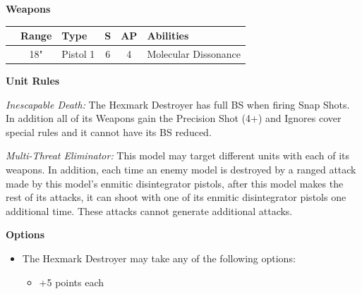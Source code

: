 \begin{minipage}[t]{0.72\textwidth}
	\vspace*{2em}
	\textbf{Weapons}
	
	\begin{tabular}{L{90 pt} c C{40pt} *{2}{c} >{\raggedright\arraybackslash}p{130pt}}
		& Range & Type & S & AP & Abilities \\
		\hline
		 & 18" & Pistol 1 & 6 & 4 & Molecular Dissonance \\
	\end{tabular}
	
	\vspace*{2em}
	\textbf{Unit Rules}
		
	\textit{Inescapable Death:} The Hexmark Destroyer has full BS when firing Snap Shots. In addition all of its Weapons gain the Precision Shot (4+) and Ignores cover special rules and it cannot have its BS reduced.
	
	\textit{Multi-Threat Eliminator:} This model may target different units with each of its weapons. In addition, each time an enemy model is destroyed by a ranged attack made by this model's enmitic disintegrator pistols, after this model makes the rest of its attacks, it can shoot with one of its enmitic disintegrator pistols one additional time. These attacks cannot generate additional attacks.
		
	\vspace*{2em}
	\textbf{Options}
	\begin{itemize}
		\item The Hexmark Destroyer may take any of the following options:
		\begin{itemize}
			\item {} \dotfill +5 points each
		\end{itemize}
	\end{itemize}
\end{minipage}
\hspace{0.5em}


\newpage
\subsubsection[Skorpekh Destroyer Vanguard]{}

